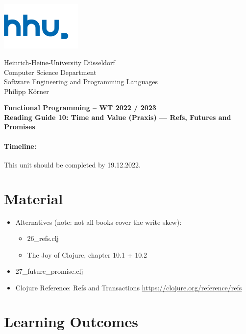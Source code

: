 \documentclass[11pt,a4paper]{article}
\begin{document}
\begin{minipage}[b]{\textwidth}
	\parbox[t]{5cm}{%
		\includegraphics[width=4cm]{unilogo}
		\hfill
	}
	\parbox[b]{11cm}{%
		Heinrich-Heine-University D\"usseldorf\\
		Computer Science Department\\
		Software Engineering and Programming Languages\\
		Philipp K\"orner
	}
\end{minipage}
\begin{center}
	\bf
	Functional Programming -- WT 2022 / 2023\\
	Reading Guide 10: Time and Value (Praxis) --- Refs, Futures and Promises
\end{center}

\pagestyle{empty}

\paragraph{Timeline:} This unit should be completed by 19.12.2022.

\section{Material} 

\begin{itemize}
    \item Alternatives (note: not all books cover the write skew):
        \begin{itemize}
            \item 26\_refs.clj
            \item The Joy of Clojure, chapter 10.1 + 10.2
        \end{itemize}
            \item 27\_future\_promise.clj
    \item Clojure Reference: Refs and Transactions \url{https://clojure.org/reference/refs}
\end{itemize}


\section{Learning Outcomes}
\end{document}

